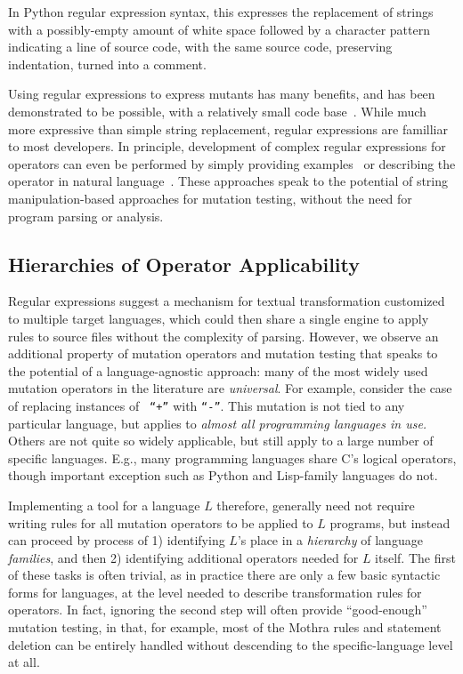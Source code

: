 \documentclass[sigconf,review, anonymous]{acmart}
\begin{document}
In Python regular expression syntax, this expresses the replacement of
strings with a possibly-empty amount of white space followed by a
character pattern indicating a line of source code, with the same
source code, preserving indentation, turned into a comment.

Using regular expressions to express mutants has many benefits, and
has been demonstrated to be possible, with a relatively small code base~\cite{regexpMut}.  While
much more expressive than simple string replacement, regular
expressions are familliar to most developers.  In principle,
development of complex regular expressions for operators can even be
performed by simply providing examples~\cite{bartoli2014automatic}  or
describing the operator in natural
language~\cite{zhong2018generating}.  
These approaches speak to the potential of string manipulation-based approaches
for mutation testing, without the need for program parsing or analysis. 


\subsection{Hierarchies of Operator Applicability}

Regular expressions suggest a mechanism for textual transformation customized to
multiple target languages, which could then share a single engine to apply rules
to source files without the complexity of parsing. 
However, we observe an additional property of mutation operators and mutation
testing that speaks to the potential of a language-agnostic approach: many of the
most widely used mutation operators in the literature are \emph{universal}.  For
example, consider the case of replacing instances of {\tt
  ``+''}  with {\tt ``-''}.  This mutation is not tied to any
particular language, but applies to \emph{almost all programming
  languages in use.}  Others are not quite
so widely applicable, but still apply to a large number of specific
languages.  E.g., many programming languages share C's logical
operators, though important exception such as Python and Lisp-family
languages do not.

Implementing a tool for a language $L$ therefore, generally need not
require writing rules for all mutation operators to be applied to $L$
programs, but instead can proceed by process of 1) identifying $L$'s
place in a \emph{hierarchy} of language \emph{families}, and then 2)
identifying additional operators needed for $L$ itself.  The first of
these tasks is often trivial, as in practice there are only a few
basic syntactic forms for languages, at the level needed to describe
transformation rules for operators.  In fact, ignoring the second step
will often provide ``good-enough'' mutation testing, in that, for
example, most of the Mothra rules and statement deletion can be
entirely handled without descending to the specific-language level at all.
\end{document}
